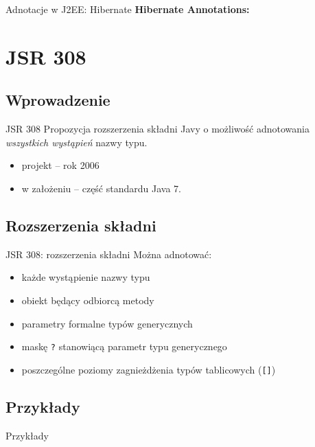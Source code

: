 \documentclass{beamer}
\begin{document}
\begin{frame}{Adnotacje w J2EE: Hibernate}
  \textbf{Hibernate Annotations:}
  
\end{frame}

\section{JSR 308}
\subsection{Wprowadzenie}
\begin{frame}{JSR 308}
Propozycja rozszerzenia składni Javy o możliwość adnotowania
\emph{wszystkich wystąpień} nazwy typu.
\pause
\begin{itemize}
\item projekt -- rok 2006
\item w założeniu -- część standardu Java 7.
\end{itemize}
\end{frame}

\subsection{Rozszerzenia składni}

\begin{frame}{JSR 308: rozszerzenia składni}
  Można adnotować:
  \begin{itemize}
  \item<1-> każde wystąpienie nazwy typu
  \item<2-> obiekt będący odbiorcą metody
  \item<3-> parametry formalne typów generycznych
  \item<4-> maskę \texttt{?} stanowiącą parametr typu generycznego
  \item<5-> poszczególne poziomy zagnieżdżenia typów tablicowych (\texttt{[]})
  \end{itemize}
\end{frame}

\subsection{Przykłady}

\begin{frame}{Przykłady}
  
  
\end{frame}
\end{document}

